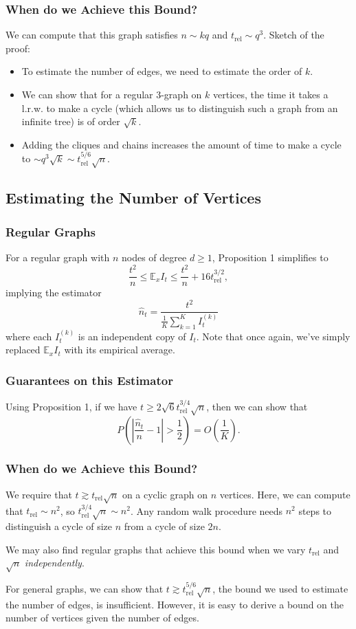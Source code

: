 \documentclass{beamer}
\newcommand{\E}{\mathbb{E}}
\begin{document}
\begin{frame}
\frametitle{When do we Achieve this Bound?}
We can compute that this graph satisfies $n\sim kq$ and $t_{\text{rel}} \sim q^3$. Sketch of the proof:
\begin{itemize}
    \item To estimate the number of edges, we need to estimate the order of $k$.
    \item We can show that for a regular 3-graph on $k$ vertices, the time it takes a l.r.w. to make a cycle (which allows us to distinguish such a graph from an infinite tree) is of order $\sqrt{k}$.
    \item Adding the cliques and chains increases the amount of time to make a cycle to $\sim q^3\sqrt{k} \sim t_{\text{rel}}^{5/6}\sqrt{n}$.
\end{itemize}
\end{frame}

\subsection{Estimating the Number of Vertices}
\begin{frame}
\frametitle{Regular Graphs}
For a regular graph with $n$ nodes of degree $d\geq 1$, Proposition 1 simplifies to
$$
\frac{t^2}{n} \leq \E_x I_t \leq \frac{t^2}{n} + 16t_{\text{rel}}^{3/2},
$$
implying the estimator
$$
\hat{n}_t = \frac{t^2}{\frac{1}{K}\sum_{k=1}^K I_t^{(k)}}
$$
where each $I_t^{(k)}$ is an independent copy of $I_t$. Note that once again, we've simply replaced $\E_x I_t$ with its empirical average.
\end{frame}

\begin{frame}
\frametitle{Guarantees on this Estimator}
Using Proposition 1, if we have $t\geq 2\sqrt{6}t_{\text{rel}}^{3/4}\sqrt{n}$, then we can show that
$$
P\left(\left|\frac{\hat{n}_t}{n} - 1\right| > \frac{1}{2}\right) = O\left(\frac{1}{K}\right).
$$
\end{frame}

\begin{frame}
\frametitle{When do we Achieve this Bound?}
We require that $t\gtrsim t_{\text{rel}} \sqrt{n}$ on a cyclic graph on $n$ vertices. Here, we can compute that $t_{\text{rel}}\sim n^2$, so $t_{\text{rel}}^{3/4}\sqrt{n}\sim n^2$. Any random walk procedure needs $n^2$ steps to distinguish a cycle of size $n$ from a cycle of size $2n$.

\medskip

We may also find regular graphs that achieve this bound when we vary $t_{\text{rel}}$ and $\sqrt{n}$ \textit{independently}.

\medskip

For general graphs, we can show that $t\gtrsim t_{\text{rel}}^{5/6}\sqrt{n}$, the bound we used to estimate the number of edges, is insufficient. However, it is easy to derive a bound on the number of vertices given the number of edges.
\end{frame}
\end{document}

